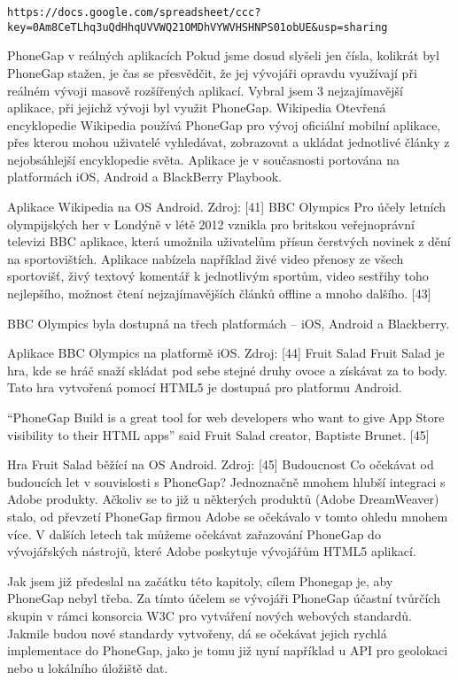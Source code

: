 \begin{verbatim}
https://docs.google.com/spreadsheet/ccc?key=0Am8CeTLhq3uQdHhqUVVWQ21OMDhVYWVHSHNPS01obUE&usp=sharing
\end{verbatim}
PhoneGap v reálných aplikacích
Pokud jsme dosud slyšeli jen čísla, kolikrát byl PhoneGap stažen, je čas se přesvědčit, že jej vývojáři opravdu využívají při reálném vývoji masově rozšířených aplikací. Vybral jsem 3 nejzajímavější aplikace, při jejichž vývoji byl využit PhoneGap.
Wikipedia
Otevřená encyklopedie Wikipedia používá PhoneGap pro vývoj oficiální mobilní aplikace, přes kterou mohou uživatelé vyhledávat, zobrazovat a ukládat jednotlivé články z nejobsáhlejší encyklopedie světa. Aplikace je v současnosti portována na platformách iOS, Android a BlackBerry Playbook.

Aplikace Wikipedia na OS Android. Zdroj: [41]
BBC Olympics
Pro účely letních olympijských her v Londýně v létě 2012 vznikla pro britskou veřejnoprávní televizi BBC aplikace, která umožnila uživatelům přísun čerstvých novinek z dění na sportovištích. Aplikace nabízela například živé video přenosy ze všech sportovišť, živý textový komentář k jednotlivým sportům, video sestřihy toho nejlepšího, možnost čtení nejzajímavějších článků offline a mnoho dalšího. [43]


BBC Olympics byla dostupná na třech platformách – iOS, Android a Blackberry.



Aplikace BBC Olympics na platformě iOS. Zdroj: [44]
Fruit Salad
Fruit Salad je hra, kde se hráč snaží skládat pod sebe stejné druhy ovoce a získávat za to body. Tato hra vytvořená pomocí HTML5 je dostupná pro platformu Android.


“PhoneGap Build is a great tool for web developers who want to give App Store visibility to their HTML apps” said Fruit Salad creator, Baptiste Brunet. [45]



Hra Fruit Salad běžící na OS Android. Zdroj: [45]
Budoucnost
Co očekávat od budoucích let v souvislosti s PhoneGap? Jednoznačně mnohem hlubší integraci s Adobe produkty. Ačkoliv se to již u některých produktů (Adobe DreamWeaver) stalo, od převzetí PhoneGap firmou Adobe se očekávalo v tomto ohledu mnohem více. V dalších letech tak můžeme očekávat zařazování PhoneGap do vývojářských nástrojů, které Adobe poskytuje vývojářům HTML5 aplikací.


Jak jsem již předeslal na začátku této kapitoly, cílem Phonegap je, aby PhoneGap nebyl třeba. Za tímto účelem se vývojáři PhoneGap účastní tvůrčích skupin v rámci konsorcia W3C pro vytváření nových webových standardů. Jakmile budou nové standardy vytvořeny, dá se očekávat jejich rychlá implementace do PhoneGap, jako je tomu již nyní například u API pro geolokaci nebo u lokálního úložiště dat.


